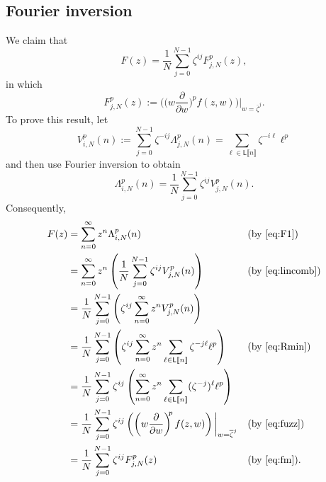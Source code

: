 \documentclass[10pt,reqno]{amsart}
\newcommand{\Le}{\mathsf{L}}
\providecommand{\multi}[1]{\llbracket #1 \rrbracket}
\newcommand{\0}{\color{lightgray}0}
\renewcommand\>{\rangle}
\newcommand\<{\langle}
\theoremstyle{plain}
\theoremstyle{definition}
\begin{document}
\subsection{Fourier inversion}
We claim that
\begin{equation}\label{eq:F2}
F(z) = \frac{1}{N} \sum_{j=0}^{N-1} \zeta^{ij} F^p_{j,N}(z),
\end{equation}
in which
\begin{equation}\label{eq:fm}
F^p_{j,N}(z)  := \bigg(\bigg(  w \dfrac{\partial}{\partial w} \bigg)^{\!\!p} f(z,w) \bigg) \bigg|_{w=\overline{\zeta}^{j}} .
\end{equation}
To prove this result, let
\begin{equation}\label{eq:Rmin}
V^p_{i,N}(n) := 
\sum_{j=0}^{N-1} \zeta^{-ij}  \Lambda^p_{j,N}(n)
=\sum_{\ell \in \Le\multi{n}} \zeta^{-i\ell} \ell^p
\end{equation}
and then use Fourier inversion to obtain
\begin{equation}\label{eq:lincomb}
\Lambda^p_{i,N}(n) 
= \frac{1}{N}  \sum_{j=0}^{N-1} \zeta^{ij}  V^p_{j,N}(n). 
\end{equation}
Consequently,
\begin{align*}
F(z)
&= \sum_{n=0}^{\infty} z^n  \Lambda^p_{i,N}(n) && \text{(by \eqref{eq:F1})} \\
&= \sum_{n=0}^{\infty} z^n \left( \frac{1}{N}  \sum_{j=0}^{N-1} \zeta^{ij}  V^p_{j,N}(n) \right) &&\text{(by \eqref{eq:lincomb})} \\
&= \frac{1}{N} \sum_{j=0}^{N-1}  \left( \zeta^{ij}   \sum_{n=0}^{\infty} z^n V^p_{j,N}(n) \right) \\
&= \frac{1}{N} \sum_{j=0}^{N-1}  \left( \zeta^{ij}   \sum_{n=0}^{\infty} z^n \sum_{\ell \in \Le\multi{n}} \zeta^{-j\ell} \ell^p\right) &&\text{(by \eqref{eq:Rmin})}\\
&= \frac{1}{N}\sum_{j=0}^{N-1}    \zeta^{ij} \left(\sum_{n=0}^{\infty} z^n \sum_{\ell \in \Le\multi{n}} (\zeta^{-j})^{\ell} \ell^p \right)\\ 
&= \frac{1}{N}\sum_{j=0}^{N-1}    \zeta^{ij}  \left(\left(  w \dfrac{\partial}{\partial w} \right)^{\!\!p} f(z,w) \right) \bigg|_{w=\overline{\zeta}^{j}} &&\text{(by \eqref{eq:fuzz})}\\
&= \frac{1}{N} \sum_{j=0}^{N-1} \zeta^{ij} F^p_{j,N}(z) &&\text{(by \eqref{eq:fm})}.
\end{align*}

\end{document}
